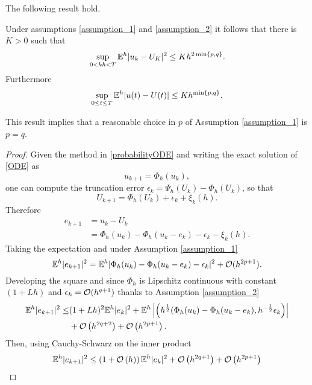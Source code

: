 \noindent The following result hold.
\begin{theorem}\label{thm:strongConv} Under assumptions \ref{assumption_1} and \ref{assumption_2} it follows that there is $K>0$ such that
\begin{equation}\label{strongConvDisc}
	\sup_{0<kh<T} \mathbb{E}^h|u_k - U_K|^2 \leq Kh^{2\min\{p,q\}}.
\end{equation}
Furthermore
\begin{equation}\label{strongConvCont}
	\sup_{0\leq t \leq T} \mathbb{E}^h|u(t) - U(t)| \leq Kh^{\min\{p, q\}}.
\end{equation}
\end{theorem}
\noindent This result implies that a reasonable choice in $p$ of Assumption \ref{assumption_1} is $p = q$.
\begin{proof}
Given the method in \eqref{probabilityODE} and writing the exact solution of \eqref{ODE} as
\begin{equation}
	u_{k+1} = \Phi_h(u_k),
\end{equation}
one can compute the truncation error $\epsilon_k = \Psi_h(U_k) - \Phi_h(U_k)$, so that
\begin{equation}
	U_{k+1} = \Phi_h(U_k) + \epsilon_k + \xi_k(h).
\end{equation}
Therefore
\begin{align}
	e_{k+1} &= u_k - U_k \\
			&= \Phi_h(u_k) - \Phi_h(u_k - e_k) - \epsilon_k - \xi_k(h).
\end{align}
Taking the expectation and under Assumption \ref{assumption_1}
\begin{equation}
	\mathbb{E}^h|e_{k+1}|^2 = \mathbb{E}^h|\Phi_h(u_k) - \Phi_h(u_k - e_k) - \epsilon_k|^2 + \mathcal{O}(h^{2p + 1}).
\end{equation}
Developing the square and since $\Phi_h$ is Lipschitz continuous with constant $(1 + Lh)$ and $\epsilon_k = \mathcal{O}(h^{q+1})$ thanks to Assumption \ref{assumption_2}
\begin{align}
	\mathbb{E}^h|e_{k+1}|^2 \leq &(1 + Lh)^2 \mathbb{E}^h|e_k|^2 + \mathbb{E}^h\left|\left(h^{\frac{1}{2}}(\Phi_h(u_k) - \Phi_h(u_k - e_k), h^{-\frac{1}{2}}\epsilon_k\right)\right| \\
						 &+ \mathcal{O}\left(h^{2q+2}\right) + \mathcal{O}\left(h^{2p + 1}\right). 
\end{align}
Then, using Cauchy-Schwarz on the inner product
\begin{align}
	\E^h|e_{k+1}|^2 &\leq \left(1 + \OO\left(h\right)\right)\E^h|e_k|^2 + \OO\left(h^{2q + 1}\right) + \OO\left(h^{2p + 1}\right) \\

\end{align}
\end{proof}
